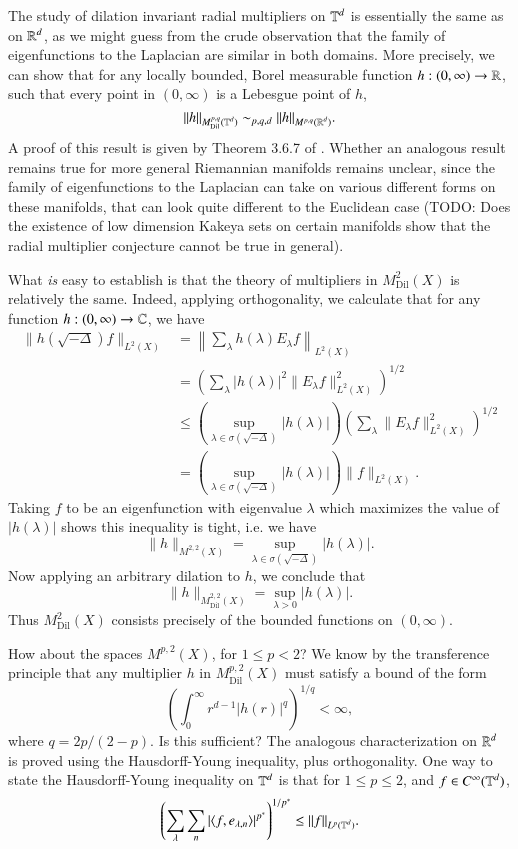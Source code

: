 The study of dilation invariant radial multipliers on $\operatorname{\mathbb{T}}^d$ is essentially the same as on $\operatorname{\mathbb{R}}^d$, as we might guess from the crude observation that the family of eigenfunctions to the Laplacian are similar in both domains. More precisely, we can show that for any locally bounded, Borel measurable function $h: (0,\infty) \to \operatorname{\mathbb{R}}$, such that every point in $(0,\infty)$ is a Lebesgue point of $h$,
%
\[ \| h \|_{M^{p,q}_{\text{Dil}}(\operatorname{\mathbb{T}}^d)} \sim_{p,q,d} \| h \|_{M^{p,q}(\operatorname{\mathbb{R}}^d)}. \]
%
A proof of this result is given by Theorem 3.6.7 of \cite{Grafakos}. Whether an analogous result remains true for more general Riemannian manifolds remains unclear, since the family of eigenfunctions to the Laplacian can take on various different forms on these manifolds, that can look quite different to the Euclidean case (TODO: Does the existence of low dimension Kakeya sets on certain manifolds show that the radial multiplier conjecture cannot be true in general).

What \emph{is} easy to establish is that the theory of multipliers in $M^2_{\text{Dil}}(X)$ is relatively the same. Indeed, applying orthogonality, we calculate that for any function $h: (0,\infty) \to \operatorname{\mathbb{C}}$, we have
%
\begin{align*}
    \| h(\sqrt{-\Delta}) f \|_{L^2(X)} &= \left\| \sum_\lambda h(\lambda) E_\lambda f \right\|_{L^2(X)}\\
    &= \left( \sum_\lambda |h(\lambda)|^2 \| E_\lambda f \|_{L^2(X)}^2 \right)^{1/2}\\
    &\leq \left( \sup_{\lambda \in \sigma(\sqrt{-\Delta})} |h(\lambda)| \right) \left( \sum_\lambda \| E_\lambda f \|_{L^2(X)}^2 \right)^{1/2}\\
    &= \left( \sup_{\lambda \in \sigma(\sqrt{-\Delta})} |h(\lambda)| \right) \| f \|_{L^2(X)}.
\end{align*}
%
Taking $f$ to be an eigenfunction with eigenvalue $\lambda$ which maximizes the value of $|h(\lambda)|$ shows this inequality is tight, i.e. we have
%
\[ \| h \|_{M^{2,2}(X)} = \sup_{\lambda \in \sigma(\sqrt{-\Delta})} |h(\lambda)|. \]
%
Now applying an arbitrary dilation to $h$, we conclude that
%
\[ \| h \|_{M^{2,2}_{\text{Dil}} (X)} = \sup_{\lambda > 0} |h(\lambda)|. \]
%
Thus $M^2_{\text{Dil}}(X)$ consists precisely of the bounded functions on $(0,\infty)$.

How about the spaces $M^{p,2}(X)$, for $1 \leq p < 2$? We know by the transference principle that any multiplier $h$ in $M^{p,2}_{\text{Dil}}(X)$ must satisfy a bound of the form
%
\[ \left( \int_0^\infty r^{d-1} |h(r)|^q \right)^{1/q} < \infty, \]
%
where $q = 2p/(2-p)$. Is this sufficient? The analogous characterization on $\operatorname{\mathbb{R}}^d$ is proved using the Hausdorff-Young inequality, plus orthogonality. One way to state the Hausdorff-Young inequality on $\operatorname{\mathbb{T}}^d$ is that for $1 \leq p \leq 2$, and $f \in C^\infty(\operatorname{\mathbb{T}}^d)$,
%
\[ \left( \sum_\lambda \sum_n |\langle f, e_{\lambda,n} \rangle|^{p^*} \right)^{1/p^*} \leq \| f \|_{L^p(\operatorname{\mathbb{T}}^d)}. \]
%


